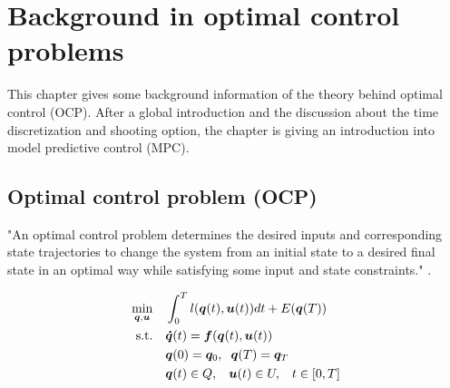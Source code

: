 \chapter{Background in optimal control problems\\}
\label{cha:OCP}

This chapter gives some background information of the theory behind optimal control (OCP). After a global introduction and the discussion about the time discretization and shooting option, the chapter is giving an introduction into model predictive control (MPC).

\section{Optimal control problem (OCP)}
\label{Optimal control problem (OCP)}
"An optimal control problem determines the desired inputs and corresponding state trajectories to change the system from an initial state to a desired final state in an optimal way while satisfying some input and state constraints." \cite{Mercy2018}.

\begin{equation}
\label{eq:OCP}
\begin{aligned}
\min_{\bm{q},\bm{u}} \quad & \int_{0}^{T}l(\bm{q}(t),\bm{u}(t))dt + E(\bm{q}(T)) \\
\textrm{s.t.} \quad & \bm{\dot{q}}(t) = \bm{f}(\bm{q}(t), \bm{u}(t))\\
& \bm{q}(0)= \bm{q}_{0},\hspace{2 mm}\bm{q}(T)= \bm{q}_{T}    \\
& \bm{q}(t)\in Q,\hspace{3 mm} \bm{u}(t)\in U, \hspace{3 mm} t\in [0, T]
\end{aligned}
\end{equation}

